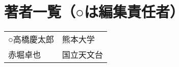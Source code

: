 \newpage
\section*{著者一覧（○は編集責任者）}
\begin{tabular}{ll}
\noalign{\smallskip}
○高橋慶太郎 & 熊本大学 \\
赤堀卓也 & 国立天文台 \\

\end{tabular}

